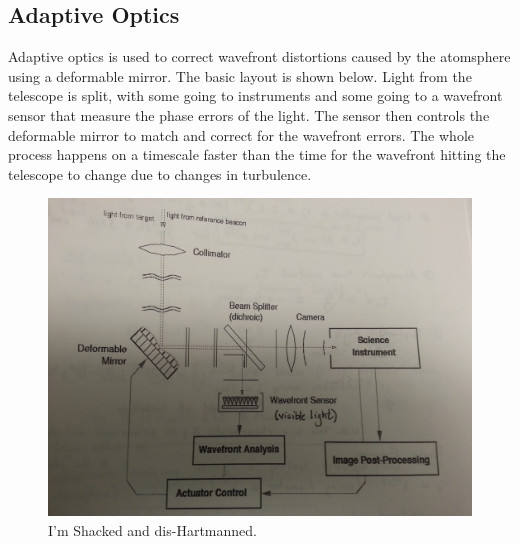 \subsection{Adaptive Optics}
Adaptive optics is used to correct wavefront distortions caused by the 
atomsphere using a deformable mirror.  The basic layout is shown below.  Light 
from the telescope is split, with some going to instruments and some going 
to a wavefront sensor that measure the phase errors of the light.  The 
sensor then controls the deformable mirror to match and correct for the 
wavefront errors.  The whole process happens on a timescale faster than 
the time for the wavefront hitting the telescope to change due to changes in 
turbulence.  

\begin{figure}[!h]
\begin{center}
\includegraphics[width=\textwidth]{AO.jpg}
\end{center}
\caption{I'm Shacked and dis-Hartmanned.
\label{fig:AO}}
\end{figure}


